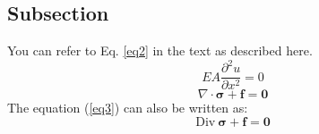 \documentclass[12pt,a4paper,titlepage]{article}
\begin{document}
\subsection{Subsection}
You can refer to Eq. \ref{eq2} in the text as described here.
%
\begin{equation}
    EA \dfrac{\partial^{2} u}{\partial x^{2}} = 0 \label{eq2}
\end{equation}
%
%
\begin{equation}
    \nabla \cdot \boldsymbol{\sigma} + \boldsymbol{f} = \mathbf{0} \label{eq3}
\end{equation}
%
The equation (\ref{eq3}) can also be written as:
%
\begin{equation}
    \mathrm{Div} \ \boldsymbol{\sigma} + \boldsymbol{f} = \mathbf{0} \label{eq4}
\end{equation}
%
%
\clearpage


\end{document}
